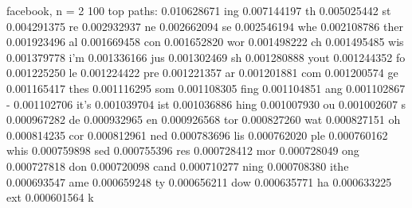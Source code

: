 \documentclass[twocolumn]{article}
\begin{document}
facebook, n = 2
100 top paths:
0.010628671 ing
0.007144197 th
0.005025442 st
0.004291375 re
0.002932937 ne
0.002662094 se
0.002546194 whe
0.002108786 ther
0.001923496 al
0.001669458 con
0.001652820 wor
0.001498222 ch
0.001495485 wis
0.001379778 i'm
0.001336166 jus
0.001302469 sh
0.001280888 yout
0.001244352 fo
0.001225250 le
0.001224422 pre
0.001221357 ar
0.001201881 com
0.001200574 ge
0.001165417 thes
0.001116295 som
0.001108305 fing
0.001104851 ang
0.001102867 -
0.001102706 it's
0.001039704 ist
0.001036886 hing
0.001007930 ou
0.001002607 s
0.000967282 de
0.000932965 en
0.000926568 tor
0.000827260 wat
0.000827151 oh
0.000814235 cor
0.000812961 ned
0.000783696 lis
0.000762020 ple
0.000760162 whis
0.000759898 sed
0.000755396 res
0.000728412 mor
0.000728049 ong
0.000727818 don
0.000720098 cand
0.000710277 ning
0.000708380 ithe
0.000693547 ame
0.000659248 ty
0.000656211 dow
0.000635771 ha
0.000633225 ext
0.000601564 k


\end{document}

